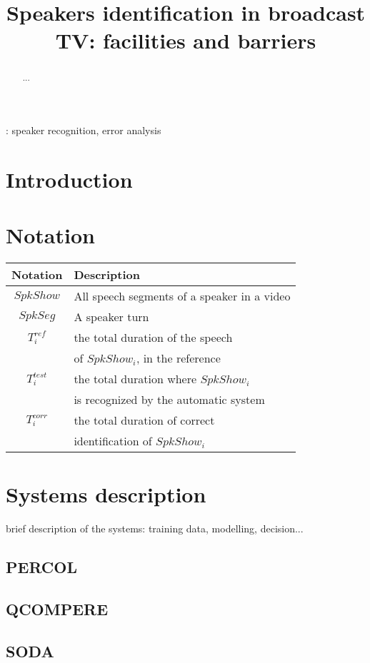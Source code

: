 \documentclass[a4paper]{article}
\title{Speakers identification in broadcast TV: facilities and barriers}
\begin{document}
\maketitle
%
\begin{abstract}
...
\end{abstract}
: speaker recognition, error analysis


\section{Introduction}

\section{\label{notation}Notation}

\begin{tabular}{|c|l|}
\hline 
Notation & Description \\ 
\hline 
\hline
$SpkShow$ & All speech segments of a speaker in a video \\ 
$SpkSeg$  & A speaker turn \\
$T^{ref}_i$ & the total duration of the speech\\
& of  $SpkShow_i$, in the reference \\
$T^{test}_i$ & the total duration where $SpkShow_i$\\
& is recognized by the automatic system\\
$T^{corr}_i$ & the total duration of correct\\
& identification of $SpkShow_i$\\

\hline 
\end{tabular} 

 
\section{Systems description}
brief description of the systems: training data, modelling, decision...
\subsection{PERCOL}

\subsection{QCOMPERE}

\subsection{SODA}
\end{document}
